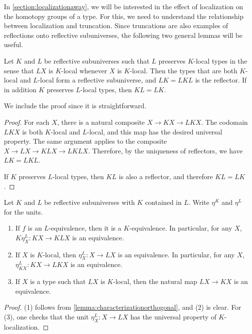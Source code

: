 In \cref{section:localizationaway}, we will be interested in the effect of localization on the homotopy groups of a type.
For this, we need to understand the relationship between localization and truncation.
Since truncations are also examples of reflections onto reflective subuniverses,
the following two general lemmas will be useful.

\begin{lem}\label{lemma:commutelocalization}
    Let $K$ and $L$ be reflective subuniverses such that $L$ preserves $K$-local types in the sense that $LX$ is $K$-local whenever $X$ is $K$-local.
    Then the types that are both $K$-local and $L$-local form a reflective subuniverse,
    and $LK = LKL$ is the reflector.
    If in addition $K$ preserves $L$-local types, then $KL = LK$.
\end{lem}

We include the proof since it is straightforward.

\begin{proof}
  For each $X$, there is a natural composite $X \to KX \to LKX$.  The codomain
  $LKX$ is both $K$-local and $L$-local, and this map has the desired universal
  property.
  The same argument applies to the composite $X \to LX \to KLX \to LKLX$.
  Therefore, by the uniqueness of reflectors, we have $LK = LKL$.

  If $K$ preserves $L$-local types, then $KL$ is also a reflector, and therefore $KL=LK$.
\end{proof}

\begin{lem}\label{lemma:comparelocalization}
    Let $K$ and $L$ be reflective subuniverses with $K$ contained in $L$.
    Write $\eta^K$ and $\eta^L$ for the units.
    \begin{enumerate}
    \item If $f$ is an $L$-equivalence, then it is a $K$-equivalence.
          In particular, for any $X$, $K\eta^L_X : KX \to KLX$ is an equivalence.
    \item If $X$ is $K$-local, then $\eta^L_X : X \to LX$ is an equivalence.
          In particular, for any $X$, $\eta^L_{KX} : KX \to LKX$ is an equivalence.
    \item If $X$ is a type such that $LX$ is $K$-local, then the 
          natural map $LX \to KX$ is an equivalence.
    \end{enumerate}
\end{lem}

\begin{proof}
(1) follows from \cref{lemma:characterizationorthogonal}, and (2) is clear.
For (3), one checks that the unit $\eta^L_X : X \to LX$ has the universal
property of $K$-localization.
\end{proof}

